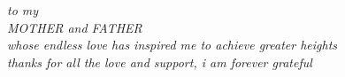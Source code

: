 \documentclass[12pt]{report}
\begin{document}
\begin{CenteredPage}
{\it to my\\[0.2in]
MOTHER and FATHER\\[0.2in]
whose endless love has inspired me to achieve greater heights \\ [0.2in]
thanks for all the love and support, i am forever grateful}
\end{CenteredPage}



\tableofcontents        %

\listoftables

\listoffigures



\StartBody





     
%
         

%



\end{document}
